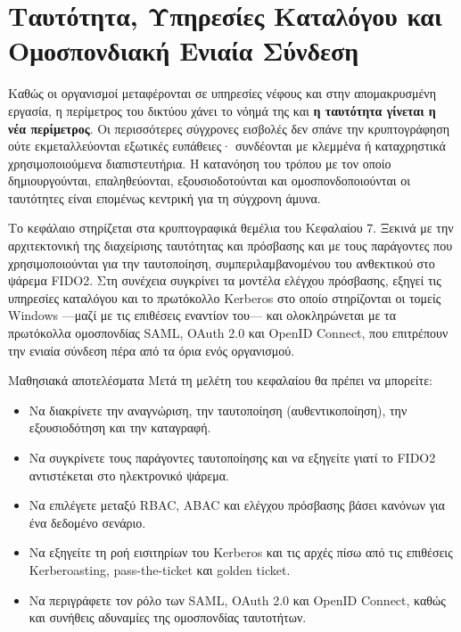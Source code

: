 \chapter{Ταυτότητα, Υπηρεσίες Καταλόγου και Ομοσπονδιακή Ενιαία Σύνδεση}\label{ch:8}

Καθώς οι οργανισμοί μεταφέρονται σε υπηρεσίες νέφους και στην απομακρυσμένη εργασία, η περίμετρος του δικτύου χάνει το νόημά της και \textbf{η ταυτότητα γίνεται η νέα περίμετρος}. Οι περισσότερες σύγχρονες εισβολές δεν σπάνε την κρυπτογράφηση ούτε εκμεταλλεύονται εξωτικές ευπάθειες· συνδέονται με κλεμμένα ή καταχρηστικά χρησιμοποιούμενα διαπιστευτήρια. Η κατανόηση του τρόπου με τον οποίο δημιουργούνται, επαληθεύονται, εξουσιοδοτούνται και ομοσπονδοποιούνται οι ταυτότητες είναι επομένως κεντρική για τη σύγχρονη άμυνα.

Το κεφάλαιο στηρίζεται στα κρυπτογραφικά θεμέλια του Κεφαλαίου 7. Ξεκινά με την αρχιτεκτονική της διαχείρισης ταυτότητας και πρόσβασης και με τους παράγοντες που χρησιμοποιούνται για την ταυτοποίηση, συμπεριλαμβανομένου του ανθεκτικού στο ψάρεμα FIDO2. Στη συνέχεια συγκρίνει τα μοντέλα ελέγχου πρόσβασης, εξηγεί τις υπηρεσίες καταλόγου και το πρωτόκολλο Kerberos στο οποίο στηρίζονται οι τομείς Windows —μαζί με τις επιθέσεις εναντίον του— και ολοκληρώνεται με τα πρωτόκολλα ομοσπονδίας SAML, OAuth 2.0 και OpenID Connect, που επιτρέπουν την ενιαία σύνδεση πέρα από τα όρια ενός οργανισμού.

\begin{outcomesbox}{Μαθησιακά αποτελέσματα}
Μετά τη μελέτη του κεφαλαίου θα πρέπει να μπορείτε:
\begin{itemize}
  \item Να διακρίνετε την αναγνώριση, την ταυτοποίηση (αυθεντικοποίηση), την εξουσιοδότηση και την καταγραφή.
  \item Να συγκρίνετε τους παράγοντες ταυτοποίησης και να εξηγείτε γιατί το FIDO2 αντιστέκεται στο ηλεκτρονικό ψάρεμα.
  \item Να επιλέγετε μεταξύ RBAC, ABAC και ελέγχου πρόσβασης βάσει κανόνων για ένα δεδομένο σενάριο.
  \item Να εξηγείτε τη ροή εισιτηρίων του Kerberos και τις αρχές πίσω από τις επιθέσεις Kerberoasting, pass-the-ticket και golden ticket.
  \item Να περιγράφετε τον ρόλο των SAML, OAuth 2.0 και OpenID Connect, καθώς και συνήθεις αδυναμίες της ομοσπονδίας ταυτοτήτων.
\end{itemize}
\end{outcomesbox}

